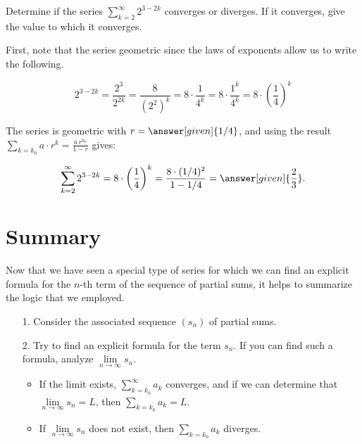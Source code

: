 \documentclass{ximera}
\begin{document}
\begin{question}
Determine if the series $\sum\limits_{k=2}^{\infty} 2^{3-2k}$ converges or diverges.  If it converges, give the value to which it converges.

\begin{explanation}
First, note that the series  geometric since the laws of exponents allow us to write the following.

\[
2^{3-2k} = \frac{2^3}{2^{2k}} = \frac{8}{\left(2^2\right)^k} =  8 \cdot \frac{1}{4^k} =  8 \cdot \frac{1^k}{4^k} =  8 \cdot \left(\frac{1}{4}\right)^k
\]

The series is geometric with $r = \answer[given]{1/4}$, and using the result $\sum\limits_{k=k_0} a \cdot r^k = \frac{a \, r^{k_0}}{1-r}$ gives:

\[
\sum\limits_{k=2}^{\infty} 2^{3-2k} =  8 \cdot \left(\frac{1}{4}\right)^k =  \frac{8 \cdot (1/4)^2}{1-1/4}  =  \answer[given]{\frac{2}{3}}.
\]
\end{explanation}

\end{question}    


























\section{Summary}
Now that we have seen a special type of series for which we can find an explicit formula for the $n$-th term of the sequence of partial sums, it helps to summarize the logic that we employed.

\begin{itemize}
\item[1.] Consider the associated sequence $(s_n)$ of partial sums.
\item[2.] Try to find an explicit formula for the term $s_n$.  If you can find such a formula, analyze $\lim\limits_{n \to \infty} s_n$.  
\begin{itemize}
\item If the limit exists, $\sum\limits_{k=k_0}^{\infty} a_k$ converges, and if we can determine that $\lim\limits_{n \to \infty} s_n =L$, then $\sum\limits_{k=k_0} a_k=L$.  \item If  $\lim\limits_{n \to \infty} s_n$ does not exist, then $\sum\limits_{k=k_0} a_k$ diverges.
\end{itemize}
\end{itemize}
\end{document}
